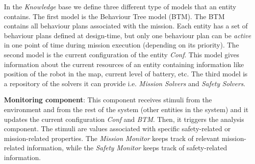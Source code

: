 \documentclass[journal]{IEEEtran}
\theoremstyle{definition}
\begin{document}
In the \textit{Knowledge} base we define three different type of models that an entity contains. The first model is the Behaviour Tree model (BTM). The BTM contains all behaviour plans associated with the mission. Each entity has a set of behaviour plans defined at design-time, but only one behaviour plan can be \textit{active} in one point of time during mission execution (depending on its priority).
The second model is the current configuration of the entity \textit{Conf}. This model gives information about the current resources of an entity containing information like position of the robot in the map, current level of battery, etc.
The third model is a repository of the solvers it can provide i.e. \textit{Mission Solvers} and \textit{Safety Solvers}.

\textbf{Monitoring component}: This component receives stimuli from the environment and from the rest of the system (other entities in the system) and it updates the current configuration \textit{Conf} and \textit{BTM}. Then, it triggers the analysis component.
The stimuli are values associated with specific safety-related or mission-related properties. The \textit{Mission Monitor} keeps track of relevant mission-related information, while the \textit{Safety Monitor} keeps track of safety-related information. 





\end{document}
